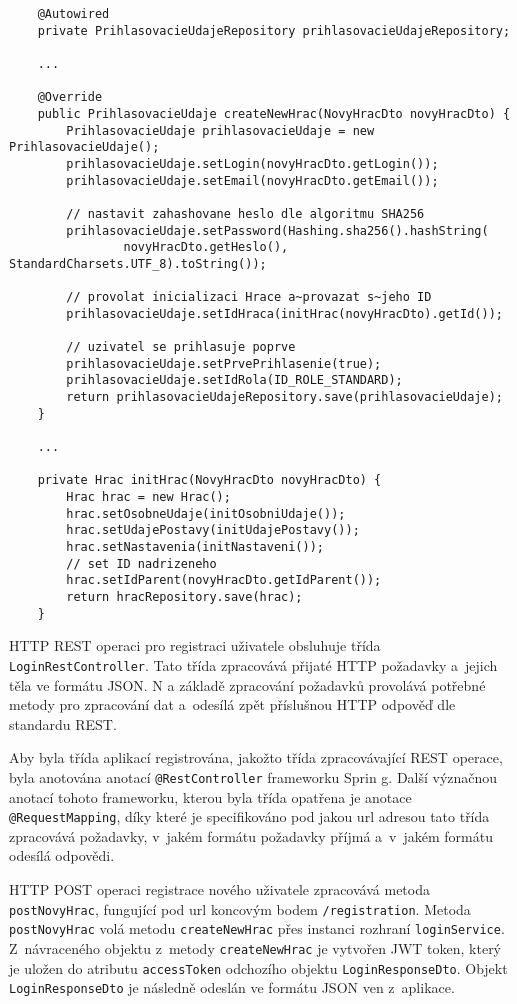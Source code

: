\documentclass[12pt]{article}
\begin{document}
{\begin{lstlisting}
    @Autowired
    private PrihlasovacieUdajeRepository prihlasovacieUdajeRepository;
    
    ...

    @Override
    public PrihlasovacieUdaje createNewHrac(NovyHracDto novyHracDto) {
        PrihlasovacieUdaje prihlasovacieUdaje = new PrihlasovacieUdaje();
        prihlasovacieUdaje.setLogin(novyHracDto.getLogin());
        prihlasovacieUdaje.setEmail(novyHracDto.getEmail());

        // nastavit zahashovane heslo dle algoritmu SHA256
        prihlasovacieUdaje.setPassword(Hashing.sha256().hashString(
                novyHracDto.getHeslo(), StandardCharsets.UTF_8).toString());

        // provolat inicializaci Hrace a~provazat s~jeho ID
        prihlasovacieUdaje.setIdHraca(initHrac(novyHracDto).getId());

        // uzivatel se prihlasuje poprve
        prihlasovacieUdaje.setPrvePrihlasenie(true);
        prihlasovacieUdaje.setIdRola(ID_ROLE_STANDARD);
        return prihlasovacieUdajeRepository.save(prihlasovacieUdaje);
    }

    ...

    private Hrac initHrac(NovyHracDto novyHracDto) {
        Hrac hrac = new Hrac();
        hrac.setOsobneUdaje(initOsobniUdaje());
        hrac.setUdajePostavy(initUdajePostavy());
        hrac.setNastavenia(initNastaveni());
        // set ID nadrizeneho
        hrac.setIdParent(novyHracDto.getIdParent());
        return hracRepository.save(hrac);
    }
\end{lstlisting}

\clearpage

HTTP REST operaci pro registraci uživatele obsluhuje třída \texttt{LoginRestController}. 
Tato třída zpracovává přijaté HTTP požadavky a~jejich těla ve formátu JSON.
N a základě zpracování požadavků provolává potřebné metody pro zpracování dat
a~odesílá zpět příslušnou HTTP odpověď dle standardu REST.

Aby byla třída aplikací registrována, jakožto třída zpracovávající REST operace,
byla anotována anotací \texttt{@RestController} frameworku Sprin
g. Další význačnou anotací tohoto frameworku, kterou byla třída opatřena je anotace\texttt{ @RequestMapping},
díky které je specifikováno pod jakou url adresou tato třída zpracovává požadavky,
v~jakém formátu požadavky příjmá a~v~jakém formátu odesílá odpovědi.

HTTP POST operaci registrace nového uživatele zpracovává metoda \texttt{postNovyHrac},
fungující pod url koncovým bodem \texttt{/registration}.
Metoda \texttt{postNovyHrac} volá metodu \texttt{createNewHrac} přes instanci rozhraní \texttt{loginService}.
Z~návraceného objektu z~metody \texttt{createNewHrac} je vytvořen JWT token,
který je uložen do atributu \texttt{accessToken} odchozího objektu \texttt{LoginResponseDto}.
Objekt \texttt{LoginResponseDto} je následně odeslán ve formátu JSON ven z~aplikace.

}
\end{document}
